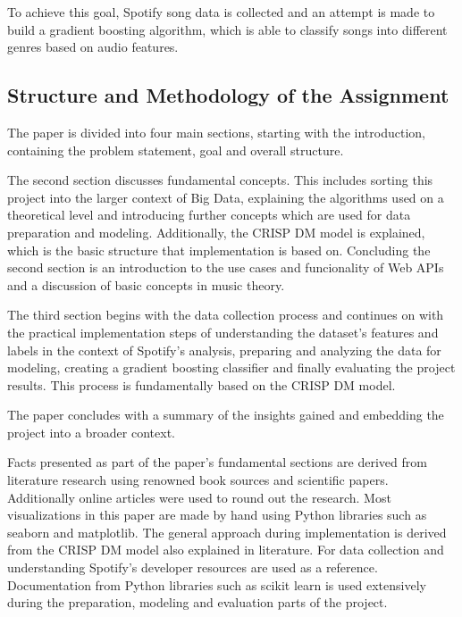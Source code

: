To achieve this goal, Spotify song data is collected and an attempt is made to build a gradient boosting
algorithm, which is able to classify songs into different genres based on audio features.

\subsection{Structure and Methodology of the Assignment}

The paper is divided into four main sections, starting with the introduction, containing the problem statement, goal and overall structure.

The second section discusses fundamental concepts. This includes sorting this project into the larger context of Big Data,
explaining the algorithms used on a theoretical level and introducing further concepts which are used for data preparation and modeling.
Additionally, the \ac{CRISP DM} model is explained, which is the basic structure that implementation is based on.
Concluding the second section is an introduction to the use cases and funcionality of Web \acp{API} and a discussion of basic concepts
in music theory.

The third section begins with the data collection process and continues on with the practical implementation steps 
of understanding the dataset's features and labels in the context of Spotify's analysis, preparing and analyzing the data for modeling, creating a
gradient boosting classifier and finally evaluating the project results. This process is fundamentally based on the CRISP DM model.

The paper concludes with a summary of the insights gained and embedding the project into a broader context.

Facts presented as part of the paper's fundamental sections are derived from literature research using renowned book sources and
scientific papers. Additionally online articles were used to round out the research.
Most visualizations in this paper are made by hand using Python libraries such as seaborn and matplotlib.
The general approach during implementation is derived from the CRISP DM model also explained in literature.
For data collection and understanding Spotify's developer resources are used as a reference.
Documentation from Python libraries such as scikit learn is used extensively during the preparation, modeling and evaluation parts
of the project.



